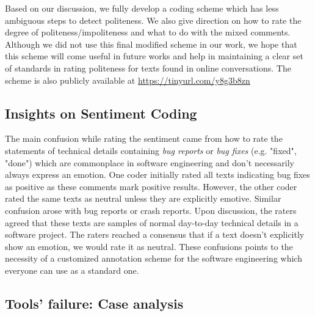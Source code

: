 Based on our discussion, 
we fully develop a coding scheme
which has less ambiguous steps to detect politeness. 
We also give direction on 
how to rate the degree of politeness/impoliteness 
and what to do with the mixed comments. 
Although we did not use this final modified scheme in our work, 
we hope that this scheme will come useful in future works 
and help in maintaining a clear set of standards 
in rating politeness for texts found in online conversations. 
The scheme is also publicly available at \href{https://tinyurl.com/y8g3b8zn}{https://tinyurl.com/y8g3b8zn}

\subsection{Insights on Sentiment Coding}\label{sentschemedis}
The main confusion 
while rating the sentiment
came from how to rate the statements of technical details 
containing \textit{bug reports} or \textit{bug fixes} 
(e.g. "fixed", "done") 
which are commonplace in software engineering and 
don't necessarily always express an emotion. 
One coder initially rated all texts indicating bug fixes 
as positive 
as these comments mark positive results. 
However, the other coder rated the same texts as neutral 
unless they are explicitly emotive. 
Similar confusion arose with bug reports or crash reports. 
Upon discussion, the raters agreed that 
these texts are samples of normal day-to-day technical details 
in a software project. 
The raters reached a consensus 
that if a text doesn't explicitly show an emotion, 
we would rate it as neutral. 
These confusions points 
to the necessity of a customized annotation scheme 
for the software engineering 
which everyone can use as a standard one. 

\subsection{Tools' failure: Case analysis}
 
